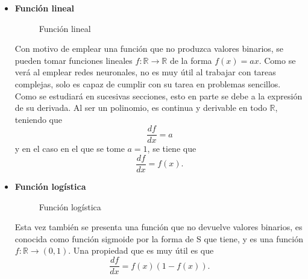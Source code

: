 		\begin{itemize}
			\item \textbf{Función lineal}
			
			\begin{figure}[!h]
				\centering
				\caption{Función lineal}
				\label{fig:funcion_lineal}
			\end{figure}
			
			Con motivo de emplear una función que no produzca valores binarios, se pueden tomar funciones lineales $f: \mathbb{R} \longrightarrow \mathbb{R}$ de la forma $f(x) = ax$. Como se verá al emplear redes neuronales, no es muy útil al trabajar con tareas complejas, solo es capaz de cumplir con su tarea en problemas sencillos. Como se estudiará en sucesivas secciones, esto en parte se debe a la expresión de su derivada. Al ser un polinomio, es continua y derivable en todo $\mathbb{R}$, teniendo que
			$$
			\frac{df}{dx} = a
			$$
			y en el caso en el que se tome $a = 1$, se tiene que
			$$
			\frac{df}{dx} = f(x). 
			$$
			
			\item \textbf{Función logística}
			
			\begin{figure}[!h]
				\centering
				\caption{Función logística}
				\label{fig:funcion_sigmoide}
			\end{figure}
			
			Esta vez también se presenta una función que no devuelve valores binarios, es conocida como función sigmoide por la forma de S que tiene, y es una función $f: \mathbb{R} \longrightarrow (0, 1)$. Una propiedad que es muy útil es que 
			$$
			\frac{df}{dx} = f(x)(1 - f(x)). 
			$$
			

\end{itemize}
